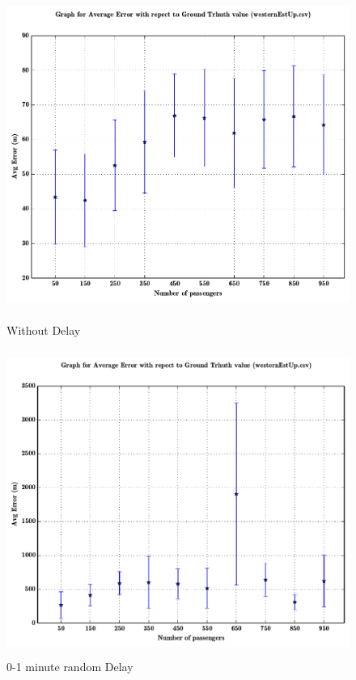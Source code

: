 \documentclass[a4paper,12pt]{report}
\begin{document}
\begin{figure}[h!]

\centering
\includegraphics[height=10cm,width=17cm]{00_withoutDelay.pdf}
\caption{Without Delay}

\centering
\includegraphics[height=10cm,width=17cm]{01_1minDelay.pdf}
\caption{0-1 minute random Delay}

\end{figure}
\end{document}
